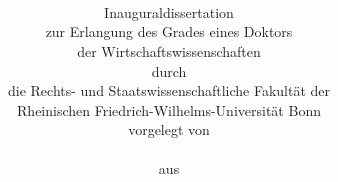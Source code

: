 





\frontmatter  %


\noindent%
\begin{center}
\begin{minipage}[t][0.99\textheight][t]{0.9\textwidth}
\title{\sffamily\bfseries\linespread{0.975}\LARGE{}%
	~\\[-10ex]
	\disstitle%
}
\author{\large{}%
	\\[10ex]%
		{\Large Inauguraldissertation}%
	\\[3ex]%
	zur Erlangung des Grades eines Doktors \\%
	der Wirtschaftswissenschaften \\[1.55ex]%
	durch \\[1.5ex]%
	die Rechts- und Staatswissenschaftliche Fakultät der \\%
	Rheinischen Friedrich-Wilhelms-Universität Bonn \\[3ex]%
	vorgelegt von \\[3ex]%
	\textbf{%
		{\Large \dissauthor}
	}
	\\[3ex]%
	aus \dissbornin
}
\ifnum {}%
	\date{%
		\vspace{15ex}%
		{\Large\dissyear}%
		\vfill%
	}%
\else%
	\date{%
		\vfill%
	}%
\fi

\maketitle
\end{minipage}
\end{center}

\thispagestyle{empty}







\newpage
\thispagestyle{empty}

\ifnum {}
	\mbox{\hspace{0pt}}	%
	\vfill

